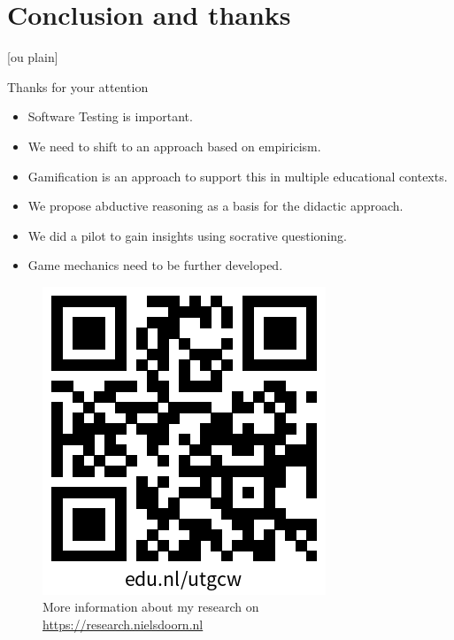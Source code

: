 \documentclass[aspectratio=169]{beamer}
\begin{document}
\section{Conclusion and thanks}


[ou plain]
\begin{frame}{Thanks for your attention}

\begin{itemize}
    \item Software Testing is important.
    \item We need to shift to an approach based on empiricism.
    \item Gamification is an approach to support this in multiple educational contexts.
    \item We propose abductive reasoning as a basis for the didactic approach.
    \item We did a pilot to gain insights using socrative questioning.
    \item Game mechanics need to be further developed.
\end{itemize}


\begin{figure}
    \centering
    \includegraphics[width=0.25\linewidth]{images//qr.png}
    \caption{More information about my research on \url{https://research.nielsdoorn.nl}}
\end{figure}
\end{frame}
\end{document}
